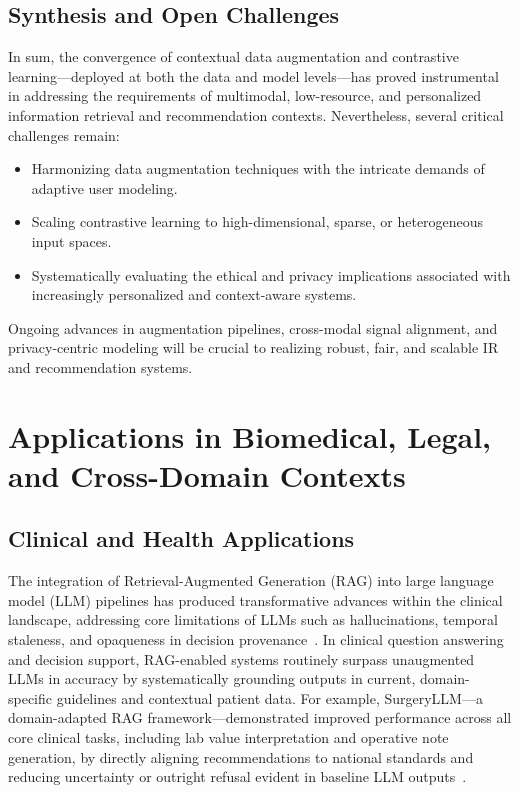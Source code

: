 \documentclass[sigconf]{acmart}
\begin{document}
\subsection{Synthesis and Open Challenges}

In sum, the convergence of contextual data augmentation and contrastive learning—deployed at both the data and model levels—has proved instrumental in addressing the requirements of multimodal, low-resource, and personalized information retrieval and recommendation contexts. Nevertheless, several critical challenges remain:

\begin{itemize}
    \item Harmonizing data augmentation techniques with the intricate demands of adaptive user modeling.
    \item Scaling contrastive learning to high-dimensional, sparse, or heterogeneous input spaces.
    \item Systematically evaluating the ethical and privacy implications associated with increasingly personalized and context-aware systems.
\end{itemize}

Ongoing advances in augmentation pipelines, cross-modal signal alignment, and privacy-centric modeling will be crucial to realizing robust, fair, and scalable IR and recommendation systems.

\section{Applications in Biomedical, Legal, and Cross-Domain Contexts}

\subsection{Clinical and Health Applications}

The integration of Retrieval-Augmented Generation (RAG) into large language model (LLM) pipelines has produced transformative advances within the clinical landscape, addressing core limitations of LLMs such as hallucinations, temporal staleness, and opaqueness in decision provenance~\cite{ref1, ref2, ref3, ref5, ref6, ref7, ref8, ref29, ref30, ref31, ref42, ref48, ref52, ref53, ref54, ref55}. In clinical question answering and decision support, RAG-enabled systems routinely surpass unaugmented LLMs in accuracy by systematically grounding outputs in current, domain-specific guidelines and contextual patient data. For example, SurgeryLLM—a domain-adapted RAG framework—demonstrated improved performance across all core clinical tasks, including lab value interpretation and operative note generation, by directly aligning recommendations to national standards and reducing uncertainty or outright refusal evident in baseline LLM outputs~\cite{ref1}.
\end{document}
